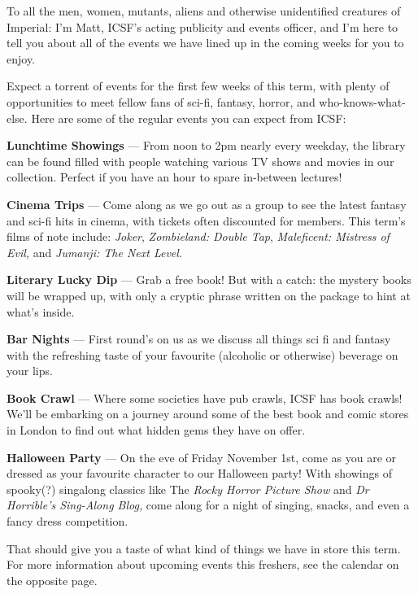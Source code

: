 To all the men, women, mutants, aliens and otherwise unidentified
creatures of Imperial: I’m Matt, ICSF’s acting publicity and events
officer, and I’m here to tell you about all of the events we have
lined up in the coming weeks for you to enjoy.

Expect a torrent of events for the first few weeks of this term, with
plenty of opportunities to meet fellow fans of sci-fi, fantasy,
horror, and who-knows-what-else.  Here are some of the regular events
you can expect from ICSF:

\textbf{Lunchtime Showings} ---
From noon to 2pm nearly every weekday, the library can be found filled
with people watching various TV shows and movies in our
collection. Perfect if you have an hour to spare in-between lectures!

\textbf{Cinema Trips} ---
Come along as we go out as a group to see the latest fantasy and
sci-fi hits in cinema, with tickets often discounted for members. This
term’s films of note include: \textit{Joker}, \textit{Zombieland:
Double Tap}, \textit{Maleficent: Mistress of Evil,}
and \textit{Jumanji: The Next Level.}

\textbf{Literary Lucky Dip} ---
Grab a free book! But with a catch: the mystery books will be wrapped
up, with only a cryptic phrase written on the package to hint at
what’s inside.

\textbf{Bar Nights} ---
First round’s on us as we discuss all things sci fi and fantasy with
the refreshing taste of your favourite (alcoholic or otherwise)
beverage on your lips.

\textbf{Book Crawl} ---
Where some societies have pub crawls, ICSF has book crawls! We’ll be
embarking on a journey around some of the best book and comic stores
in London to find out what hidden gems they have on offer.

\textbf{Halloween Party} ---
On the eve of Friday November 1st, come as you are or dressed as your
favourite character to our Halloween party!  With showings of
spooky(?) singalong classics like The \textit{Rocky Horror Picture
Show} and \textit{Dr Horrible’s Sing-Along Blog,} come along for a
night of singing, snacks, and even a fancy dress competition.

That should give you a taste of what kind of things we have in store
this term. For more information about upcoming events this freshers,
see the calendar on the opposite page.
